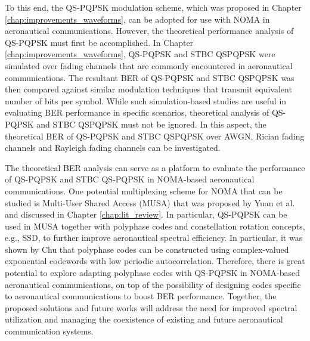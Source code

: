 To this end, the QS-PQPSK modulation scheme, which was proposed in Chapter \ref{chap:improvements_waveforms}, can be adopted for use with NOMA in aeronautical communications. However, the theoretical performance analysis of QS-PQPSK must first be accomplished. In Chapter \ref{chap:improvements_waveforms}, QS-PQPSK and STBC QSPQPSK were simulated over fading channels that are commonly encountered in aeronautical communications. The resultant BER of QS-PQPSK and STBC QSPQPSK was then compared against similar modulation techniques that transmit equivalent number of bits per symbol. While such simulation-based studies are useful in evaluating BER performance in specific scenarios, theoretical analysis of QS-PQPSK and STBC QSPQPSK  must not be ignored. In this aspect, the theoretical BER of QS-PQPSK and STBC QSPQPSK over AWGN, Rician fading channels and Rayleigh fading channels can be investigated. 

The theoretical BER analysis can serve as a platform to evaluate the performance of QS-PQPSK and STBC QS-PQPSK in NOMA-based aeronautical communications. One potential multiplexing scheme for NOMA that can be studied is Multi-User Shared Access (MUSA) that was proposed by Yuan et al. \cite{yuan2016multi} and discussed in Chapter \ref{chap:lit_review}. In particular, QS-PQPSK can be used in MUSA together with polyphase codes and constellation rotation concepts, e.g., SSD, to further improve aeronautical spectral efficiency. In particular, it was shown by Chu \cite{chu1972polyphase} that polyphase codes can be constructed using complex-valued exponential codewords with low periodic autocorrelation. Therefore, there is great potential to explore adapting polyphase codes with QS-PQPSK in NOMA-based aeronautical communications, on top of the possibility of designing codes specific to aeronautical communications to boost BER performance. Together, the proposed solutions and future works will address the need for improved spectral utilization and managing the coexistence of existing and future aeronautical communication systems.


